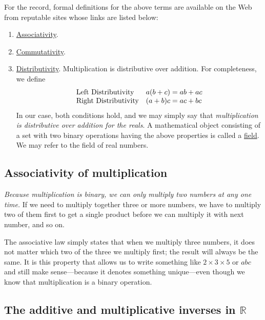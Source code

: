 \documentclass[
  a4paper,
]{article}
\begin{document}
\hfill\break
For the record, formal definitions for the above terms are available on
the Web from reputable sites whose links are listed below:

\begin{enumerate}
\item
  \href{https://mathworld.wolfram.com/Associative.html}{Associativity}.
\item
  \href{https://mathworld.wolfram.com/Commutative.html}{Commutativity}.
\item
  \href{https://en.wikipedia.org/wiki/Distributive_property}{Distributivity}.
  Multiplication is distributive over addition. For completeness, we
  define \[
  \begin{array}{l  l}
  \mbox{Left Distributivity} & a(b+c)=ab+ac\\
  \mbox{Right Distributivity} & (a+b)c=ac+bc\\
  \end{array}
  \] In our case, both conditions hold, and we may simply say that
  \emph{multiplication is distributive over addition for the reals}. A
  mathematical object consisting of a set with two binary operations
  having the above properties is called a
  \href{https://en.wikipedia.org/wiki/Field_(mathematics)}{field}. We
  may refer to the field of real numbers.
\end{enumerate}

\hypertarget{associativity-of-multiplication}{%
\subsection{Associativity of
multiplication}\label{associativity-of-multiplication}}

\emph{Because multiplication is binary, we can only multiply two numbers
at any one time.} If we need to multiply together three or more numbers,
we have to multiply two of them first to get a single product before we
can multiply it with next number, and so on.

The associative law simply states that when we multiply three numbers,
it does not matter which two of the three we multiply first; the result
will always be the same. It is this property that allows us to write
something like \(2 \times 3 \times 5\) or \(abc\) and still make
sense---because it denotes something unique---even though we know that
multiplication is a binary operation.

\hypertarget{the-additive-and-multiplicative-inverses-in-mathbbr}{%
\subsection{\texorpdfstring{The additive and multiplicative inverses in
\(\mathbb{R}\)}{The additive and multiplicative inverses in \textbackslash mathbb\{R\}}}\label{the-additive-and-multiplicative-inverses-in-mathbbr}}
\end{document}
